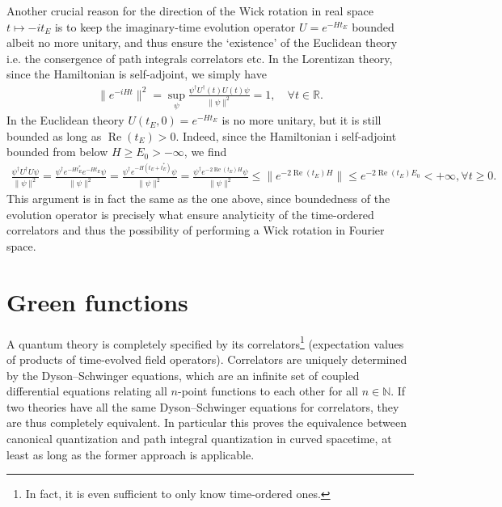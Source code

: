 \documentclass[../QFT_main.tex]{subfiles}
\begin{document}
\begin{mytheorem}
Another crucial reason for the direction of the Wick rotation in real space $t\mapsto -it_E$ is to keep the imaginary-time evolution operator $U=e^{-H t_E}$ bounded albeit no more unitary, and thus ensure the `existence' of the Euclidean theory i.e. the consergence of path integrals correlators etc.
In the Lorentizan theory, since the Hamiltonian is self-adjoint, we simply have
{\small\begin{align}
    \|e^{-i H t}\|^2 =\sup_\psi \frac{\psi ^\dagger U^\dagger(t) U(t) \psi}{\|\psi\|^2}= 1, \quad \forall t\in\mathbb{R}.
\end{align}}
In the Euclidean theory $U(t_E,0)=e^{-H t_E}$ is no more unitary, but it is still bounded as long as $\operatorname{Re}(t_E)>0$.
Indeed, since the Hamiltonian i self-adjoint bounded from below $H\geq E_0 > -\infty$, we find
{\small\begin{align}
    \tfrac{\psi^\dagger U^\dagger U \psi}{\|\psi\|^2} = \frac{\psi^\dagger e^{-H t_E^*} e^{-H t_E} \psi}{\|\psi\|^2} = \frac{\psi^\dagger e^{-H (t_E+t_E^*)} \psi}{\|\psi\|^2} = \frac{\psi^\dagger e^{-2\operatorname{Re}(t_E) H} \psi}{\|\psi\|^2} \leq \|e^{-2\operatorname{Re}(t_E) H}\| \leq e^{-2\operatorname{Re}(t_E) E_0} < +\infty, \forall t\geq0.
\end{align}}
This argument is in fact the same as the one above, since boundedness of the evolution operator is precisely what ensure analyticity of the time-ordered correlators and thus the possibility of performing a Wick rotation in Fourier space.
\end{mytheorem}



\section{Green functions}


\begin{mytheorem}
%
A quantum theory is completely specified by its correlators\footnote{In fact, it is even sufficient to only know time-ordered ones.} (expectation values of products of time-evolved field operators).
Correlators are uniquely determined by the Dyson--Schwinger equations, which are an infinite set of coupled differential equations relating all $n$-point functions to each other for all $n\in\mathbb{N}$.
If two theories have all the same Dyson--Schwinger equations for correlators, they are thus completely equivalent.
In particular this proves the equivalence between canonical quantization and path integral quantization in curved spacetime, at least as long as the former approach is applicable.
\end{mytheorem}
\end{document}
